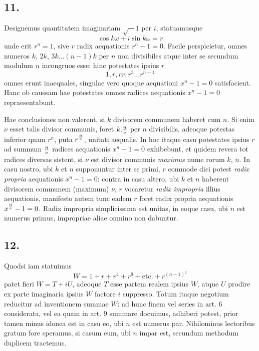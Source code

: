 \documentclass[twoside,12pt]{memoir}
\let\oldfrac\frac
\def\frac#1#2{\mathchoice{\tfrac{#1}{#2}}{\oldfrac{#1}{#2}}{\genfrac{}{}{}{2}{#1}{#2\mathstrut}}{\genfrac{}{}{}{3}{#1}{#2\mathstrut}}}
\begin{document}
\subsection*{11.}
 
Designemus quantitatem imaginariam \(\surd-1\) per \(i\), statuamusque
\[\cos k \omega+i \sin k \omega=r\]
unde erit \(r^{n}=1\), sive \(r\) radix aequationis \(r^{n}-1=0\). Facile perspicietur, omnes numeros \(k\), \(2 k\), \(3 k \ldots(n-1) k\) per \(n\) non divisibiles atque inter se secundum modulum \(n\) incongruos esse: hinc potestates ipsius \(r\)
\[1, r, r r, r^{3} \ldots r^{n-1}\]
omnes erunt inaequales, singulae vero quoque aequationi \(x^{n}-1=0\) satisfacient. Hanc ob caussam hae potestates omnes radices aequationis \(x^{n}-1=0\) repraesentabunt.

Hae conclusiones non valerent, si \(k\) divisorem communem haberet cum \(n\). Si enim \(\nu\) esset talis divisor communis, foret \(k . \frac{n}{\nu}\) per \(n\) divisibilis, adeoque potestas inferior quam \(r^{n}\), puta \(r^{\frac{n}{\nu}}\), unitati aequalis. In hoc itaque casu potestates ipsius \(r\) ad summum \(\frac{n}{\nu}\) radices aequationis \(x^{n}-1=0\) exhibebunt, et quidem revera tot radices diversas sistent, si \(\nu\) est divisor communis \textit{maximus} nume\pagebreak%
rorum \(k\), \(n\). In casu nostro, ubi \(k\) et \(n\) supponuntur inter se primi, \(r\) commode dici potest \textit{radix propria} aequationis \(x^{n}-1=0\): contra in casu altero, ubi \(k\) et \(n\) haberent divisorem communem (maximum) \(\nu\), \(r\) vocaretur \textit{radix impropria} illius aequationis, manifesto autem tunc eadem \(r\) foret radix propria aequationis \(x^{\frac{n}{\nu}}-1=0\). Radix impropria simplicissima est unitas, in eoque casu, ubi \(n\) est numerus primus, impropriae aliae omnino non dabuntur.

\subsection*{12.}
 
Quodsi iam statuimus
\[W=1+r+r^{4}+r^{9}+\text{etc.}+r^{(n-1)^{2}}\]
patet fieri \(W=T+i U\), adeoque \(T\) esse partem realem ipsius \(W\), atque \(U\) prodire ex parte imaginaria ipsius \(W\) factore \(i\) suppresso. Totum itaque negotium reducitur ad inventionem summae \(W\): ad hunc finem vel series in art. 6 considerata, vel ea quam in art. 9 summare docuimus, adhiberi potest, prior tamen minus idonea est in casu eo, ubi \(n\) est numerus par. Nihilominus lectoribus gratum fore speramus, si casum eum, ubi \(n\) impar est, secundum methodum duplicem tractemus.
\end{document}
